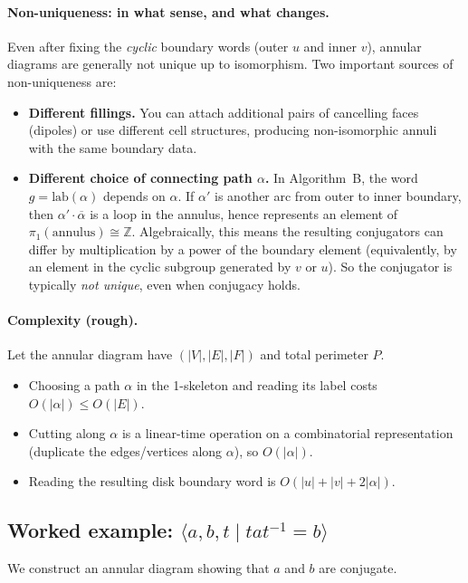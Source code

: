 \documentclass[11pt]{article}
\theoremstyle{definition}
\theoremstyle{plain}
\theoremstyle{remark}
\newcommand{\lab}{\mathrm{lab}}
\begin{document}
\paragraph{Non-uniqueness: in what sense, and what changes.}
Even after fixing the \emph{cyclic} boundary words (outer $u$ and inner $v$), annular diagrams are generally not unique up to isomorphism.
Two important sources of non-uniqueness are:
\begin{itemize}[leftmargin=2em]
\item \textbf{Different fillings.} You can attach additional pairs of cancelling faces (dipoles) or use different cell structures, producing non-isomorphic annuli with the same boundary data.
\item \textbf{Different choice of connecting path $\alpha$.} In Algorithm~B, the word $g=\lab(\alpha)$ depends on $\alpha$.
If $\alpha'$ is another arc from outer to inner boundary, then $\alpha' \cdot \overline{\alpha}$ is a loop in the annulus, hence represents an element of $\pi_1(\text{annulus})\cong\mathbb Z$.
Algebraically, this means the resulting conjugators can differ by multiplication by a power of the boundary element (equivalently, by an element in the cyclic subgroup generated by $v$ or $u$).
So the conjugator is typically \emph{not unique}, even when conjugacy holds.
\end{itemize}

\paragraph{Complexity (rough).}\cite{lyndonschupp1977}
Let the annular diagram have $(|V|,|E|,|F|)$ and total perimeter $P$.
\begin{itemize}[leftmargin=2em]
\item Choosing a path $\alpha$ in the 1-skeleton and reading its label costs $O(|\alpha|)\le O(|E|)$.
\item Cutting along $\alpha$ is a linear-time operation on a combinatorial representation (duplicate the edges/vertices along $\alpha$), so $O(|\alpha|)$.
\item Reading the resulting disk boundary word is $O(|u|+|v|+2|\alpha|)$.
\end{itemize}
\subsection*{Worked example: $\langle a,b,t \mid t a t^{-1}=b\rangle$}
We construct an annular diagram showing that $a$ and $b$ are conjugate.
\end{document}
